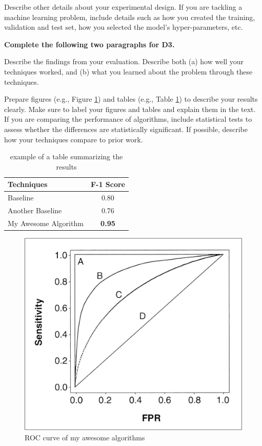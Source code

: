 \documentclass[letterpaper]{article} %
\begin{document}
Describe other details about your experimental design.  If you are tackling a machine learning problem, include details such as how you created the training, validation and test set, how you selected the model's hyper-parameters, etc.    

{\bf Complete the following two paragraphs for D3.}

Describe the findings from your evaluation.  Describe both (a) how well your techniques worked, and (b) what you learned about the problem through these techniques.  

Prepare figures (e.g., Figure \ref{fig:results2}) and tables (e.g., Table \ref{tab:results1}) to describe your results clearly.  Make sure to label your figures and tables and explain them in the text.  If you are comparing the performance of algorithms, include statistical tests to assess whether the differences are statistically significant.  If possible, describe how your techniques compare to prior work.  

\begin{table}[h!]
    \centering
    \normalsize{
    \begin{tabular}{ l c }
    \hline
         Techniques & F-1 Score\\
         \hline
          Baseline & 0.80 \\
          Another Baseline & 0.76\\
          My Awesome Algorithm & {\bf 0.95}\\
         \hline
    \end{tabular}}
    \caption{example of a table summarizing the results}
    \label{tab:results1}
\end{table} 

\begin{figure}[htbp!]
  \centering
  \includegraphics[width=0.9\linewidth]{figures/roc.png}
  \caption{ROC curve of my awesome algorithms}
  \label{fig:results2}
\end{figure}
\end{document}

